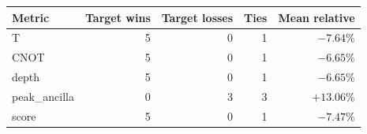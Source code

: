 \begin{tabular}{lrrrr}
\toprule
Metric & Target wins & Target losses & Ties & Mean relative \\
\midrule
T & 5 & 0 & 1 & $-7.64\%$ \\
CNOT & 5 & 0 & 1 & $-6.65\%$ \\
depth & 5 & 0 & 1 & $-6.65\%$ \\
peak_ancilla & 0 & 3 & 3 & $+13.06\%$ \\
score & 5 & 0 & 1 & $-7.47\%$ \\
\bottomrule
\end{tabular}
